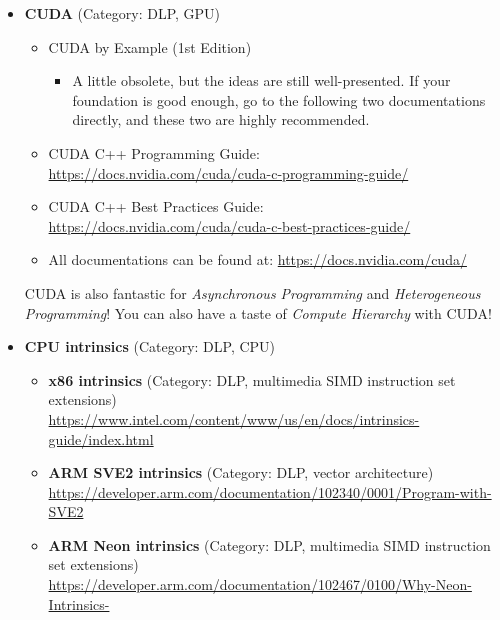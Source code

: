 \documentclass{article}
\begin{document}
\begin{itemize}
    \item \textbf{CUDA} (Category: DLP, GPU)
    \begin{itemize}
        \item CUDA by Example (1st Edition) \cite{sanders2010cuda}
        \begin{itemize}
            \item A little obsolete, but the ideas are still well-presented.
            If your foundation is good enough, go to the following two documentations directly, and these two are highly recommended.
        \end{itemize}
        \item CUDA C++ Programming Guide:\\
        \href{https://docs.nvidia.com/cuda/cuda-c-programming-guide/}{https://docs.nvidia.com/cuda/cuda-c-programming-guide/}
        \item CUDA C++ Best Practices Guide:\\
        \href{https://docs.nvidia.com/cuda/cuda-c-best-practices-guide/}{https://docs.nvidia.com/cuda/cuda-c-best-practices-guide/}
        \item All documentations can be found at:
        \href{https://docs.nvidia.com/cuda/}{https://docs.nvidia.com/cuda/}
    \end{itemize}
    CUDA is also fantastic for \emph{Asynchronous Programming} and \emph{Heterogeneous Programming}!
    You can also have a taste of \emph{Compute Hierarchy} with CUDA!
    \item \textbf{CPU intrinsics} (Category: DLP, CPU)
    \begin{itemize}
        \item \textbf{x86 intrinsics} (Category: DLP, multimedia SIMD instruction set extensions)\\
        \href{https://www.intel.com/content/www/us/en/docs/intrinsics-guide/index.html}{https://www.intel.com/content/www/us/en/docs/intrinsics-guide/index.html}
        \item \textbf{ARM SVE2 intrinsics} (Category: DLP, vector architecture)\\
        \href{https://developer.arm.com/documentation/102340/0001/Program-with-SVE2}{https://developer.arm.com/documentation/102340/0001/Program-with-SVE2}
        \item \textbf{ARM Neon intrinsics} (Category: DLP, multimedia SIMD instruction set extensions)\\
        \href{https://developer.arm.com/documentation/102467/0100/Why-Neon-Intrinsics-}{https://developer.arm.com/documentation/102467/0100/Why-Neon-Intrinsics-}

\end{itemize}
\end{itemize}
\end{document}
